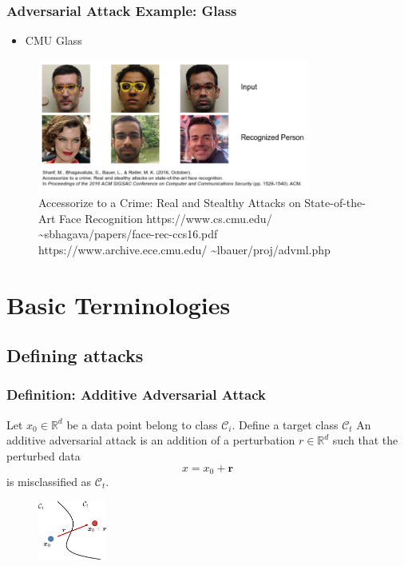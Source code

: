 \documentclass[8pt,dvipsnames]{beamer}
\newenvironment{customtheorem}[1]
{%
	\tcolorbox[
	enhanced,
	colback=blue!5,
	colframe=blue!60!black,
	coltitle=black,
	colbacktitle=blue!5,
	fonttitle=\bfseries,
	attach boxed title to top left={yshift=-2mm, xshift=2mm},
	boxed title style={sharp corners},
	sharp corners,
	title=#1
	]
}
{%
	\endtcolorbox
}
\begin{document}
\begin{frame}
	\frametitle{Adversarial Attack Example: Glass}
	\begin{itemize}
		\item CMU Glass
	\end{itemize}
	\begin{figure}[htbp]
		\centering
		\includegraphics[width=0.8\textwidth]{imgs/adv_overview_8.png}
		\caption{Accessorize to a Crime: Real and Stealthy Attacks on State-of-the-Art Face Recognition 
			https://www.cs.cmu.edu/ \sim sbhagava/papers/face-rec-ccs16.pdf https://www.archive.ece.cmu.edu/ \sim lbauer/proj/advml.php}
	\end{figure}
\end{frame}

\section{Basic Terminologies}

\subsection{Defining attacks}
\begin{frame}
	\frametitle{Definition: Additive Adversarial Attack}
	\begin{customtheorem}{Additive Adversarial Attack}
Let \(x_{0} \in \mathbb{R}^{d}\) be a data point belong to class \(\mathcal{C}_{i}\). Define a target class \(\mathcal{C}_{t}\)
An additive adversarial attack is an addition of a perturbation \(r \in \mathbb{R}^{d}\)
such that the perturbed data
$$
x=x_{0}+\boldsymbol{r}
$$
is misclassified as \(\mathcal{C}_{t}\).
	\end{customtheorem}
	\begin{figure}[htbp]
		\centering
		\includegraphics[width=0.2\textwidth]{imgs/adv_overview_9.png}
	\end{figure}
\end{frame}
\end{document}
